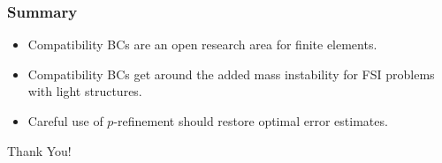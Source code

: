 \documentclass[8pt]{beamer}
\begin{document}
\begin{frame}
    \frametitle{Summary}
    \begin{itemize}
        \item Compatibility BCs are an open research area for finite elements.
        \item Compatibility BCs get around the added mass instability for FSI
              problems with light structures.
        \item Careful use of \(p\)-refinement should restore optimal error
              estimates.
    \end{itemize}
\end{frame}

\begin{frame}
    \begin{center}
        \textcolor{RPIred}{\Huge Thank You!}
    \end{center}
\end{frame}

\begin{frame}[allowframebreaks]
    
    \tiny
    {
    
    }
\end{frame}
\end{document}
